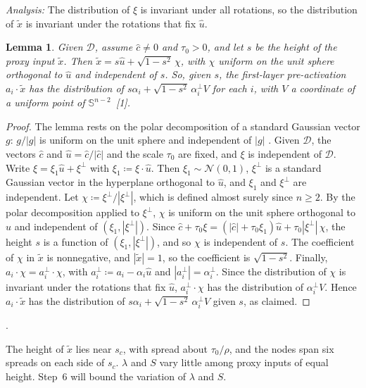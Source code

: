 \documentclass[10pt]{article}
\newcommand{\leanmark}[1]{{\relscale{0.78}\color{gray}[#1]}}
\newenvironment{leanitems}{\par\smallskip\relscale{0.78}\color{gray}\hypersetup{urlcolor=gray}\raggedright%
  \begin{list}{}{\setlength{\leftmargin}{2em}\setlength{\labelwidth}{1.6em}%
  \setlength{\labelsep}{0.4em}\setlength{\itemsep}{0pt}\setlength{\topsep}{0pt}%
  \setlength{\parsep}{0pt}}}{\end{list}\par\medskip}
\newtheorem{lemma}{Lemma}
\newcommand{\Dd}{\mathcal{D}}\newcommand{\Ee}{\mathcal{E}}
\newcommand{\SSS}{\mathbb{S}}\newcommand{\Kk}{\mathcal{K}}\newcommand{\Nn}{\mathcal{N}}\newcommand{\Bb}{\mathcal{B}}
\newcommand{\chat}{\hat c}
\begin{document}
\begin{enumerate}[leftmargin=*,itemsep=8pt,topsep=10pt plus 2pt]
  \emph{Analysis:} The distribution of $\xi$ is invariant under all
  rotations, so the distribution of $\tilde x$ is invariant under the
  rotations that fix $\hat u$.
  \begin{lemma}\label{lem:height}
    Given $\Dd$, assume $\chat\ne0$ and $\tau_0>0$, and let $s$ be the height of
    the proxy input $\tilde x$. Then $\tilde x=s\hat u+\sqrt{1-s^2}\,\chi$, with
    $\chi$ uniform on the unit sphere orthogonal to $\hat u$ and independent of
    $s$. So, given $s$, the first-layer pre-activation $a_i\cdot\tilde x$ has
    the distribution of $s\alpha_i+\sqrt{1-s^2}\,\alpha^\perp_iV$ for each
    $i$, with $V$ a coordinate of a uniform point of
    $\SSS^{n-2}$~\leanmark{1}.
  \end{lemma}
  \begin{proof}
  The lemma rests on the polar decomposition of a standard Gaussian vector
  $g$: $g/|g|$ is uniform on the unit sphere and independent of $|g|$
  \citep[Exercise~3.3.7]{vershynin-2018-hdp}. Given $\Dd$, the vectors
  $\chat$ and $\hat u=\chat/|\chat|$ and the scale $\tau_0$ are fixed, and
  $\xi$ is independent of $\Dd$. Write $\xi=\xi_1\hat u+\xi^\perp$ with
  $\xi_1\coloneqq\xi\cdot\hat u$. Then $\xi_1\sim\Nn(0,1)$, $\xi^\perp$ is a
  standard Gaussian vector in the hyperplane orthogonal to $\hat u$, and
  $\xi_1$ and $\xi^\perp$ are independent. Let $\chi\coloneqq\xi^\perp/|\xi^\perp|$,
  which is defined almost surely since $n\ge2$. By the polar decomposition
  applied to $\xi^\perp$, $\chi$ is uniform on the unit sphere orthogonal to
  $\hat u$ and independent of $(\xi_1,|\xi^\perp|)$. Since
  $\chat+\tau_0\xi=(|\chat|+\tau_0\xi_1)\hat u+\tau_0|\xi^\perp|\,\chi$, the
  height $s$ is a function of $(\xi_1,|\xi^\perp|)$, and so $\chi$ is
  independent of $s$. The coefficient of $\chi$ in $\tilde x$ is nonnegative,
  and $|\tilde x|=1$, so the coefficient is $\sqrt{1-s^2}$. Finally,
  $a_i\cdot \chi=a_i^\perp\cdot \chi$, with $a_i^\perp\coloneqq a_i-\alpha_i\hat u$
  and $|a_i^\perp|=\alpha^\perp_i$. Since the distribution of $\chi$ is invariant
  under the rotations that fix $\hat u$, $a_i^\perp\cdot \chi$ has the
  distribution of $\alpha^\perp_iV$. Hence $a_i\cdot\tilde x$ has the
  distribution of $s\alpha_i+\sqrt{1-s^2}\,\alpha^\perp_iV$ given $s$, as
  claimed.
  \end{proof}
  \begin{leanitems}
  .
  \end{leanitems}
  The height of $\tilde x$ lies near $s_c$, with spread about $\tau_0/\rho$,
  and the nodes span six spreads on each side of $s_c$. $\lambda$ and $S$ vary
  little among proxy inputs of equal height. Step~6 will bound the variation
  of $\lambda$ and $S$.


\end{enumerate}
\end{document}
